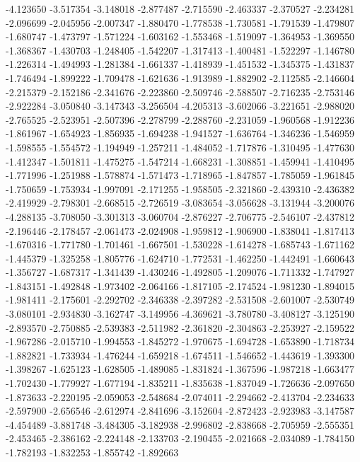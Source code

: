 -4.123650
-3.517354
-3.148018
-2.877487
-2.715590
-2.463337
-2.370527
-2.234281
-2.096699
-2.045956
-2.007347
-1.880470
-1.778538
-1.730581
-1.791539
-1.479807
-1.680747
-1.473797
-1.571224
-1.603162
-1.553468
-1.519097
-1.364953
-1.369550
-1.368367
-1.430703
-1.248405
-1.542207
-1.317413
-1.400481
-1.522297
-1.146780
-1.226314
-1.494993
-1.281384
-1.661337
-1.418939
-1.451532
-1.345375
-1.431837
-1.746494
-1.899222
-1.709478
-1.621636
-1.913989
-1.882902
-2.112585
-2.146604
-2.215379
-2.152186
-2.341676
-2.223860
-2.509746
-2.588507
-2.716235
-2.753146
-2.922284
-3.050840
-3.147343
-3.256504
-4.205313
-3.602066
-3.221651
-2.988020
-2.765525
-2.523951
-2.507396
-2.278799
-2.288760
-2.231059
-1.960568
-1.912236
-1.861967
-1.654923
-1.856935
-1.694238
-1.941527
-1.636764
-1.346236
-1.546959
-1.598555
-1.554572
-1.194949
-1.257211
-1.484052
-1.717876
-1.310495
-1.477630
-1.412347
-1.501811
-1.475275
-1.547214
-1.668231
-1.308851
-1.459941
-1.410495
-1.771996
-1.251988
-1.578874
-1.571473
-1.718965
-1.847857
-1.785059
-1.961845
-1.750659
-1.753934
-1.997091
-2.171255
-1.958505
-2.321860
-2.439310
-2.436382
-2.419929
-2.798301
-2.668515
-2.726519
-3.083654
-3.056628
-3.131944
-3.200076
-4.288135
-3.708050
-3.301313
-3.060704
-2.876227
-2.706775
-2.546107
-2.437812
-2.196446
-2.178457
-2.061473
-2.024908
-1.959812
-1.906900
-1.838041
-1.817413
-1.670316
-1.771780
-1.701461
-1.667501
-1.530228
-1.614278
-1.685743
-1.671162
-1.445379
-1.325258
-1.805776
-1.624710
-1.772531
-1.462250
-1.442491
-1.660643
-1.356727
-1.687317
-1.341439
-1.430246
-1.492805
-1.209076
-1.711332
-1.747927
-1.843151
-1.492848
-1.973402
-2.064166
-1.817105
-2.174524
-1.981230
-1.894015
-1.981411
-2.175601
-2.292702
-2.346338
-2.397282
-2.531508
-2.601007
-2.530749
-3.080101
-2.934830
-3.162747
-3.149956
-4.369621
-3.780780
-3.408127
-3.125190
-2.893570
-2.750885
-2.539383
-2.511982
-2.361820
-2.304863
-2.253927
-2.159522
-1.967286
-2.015710
-1.994553
-1.845272
-1.970675
-1.694728
-1.653890
-1.718734
-1.882821
-1.733934
-1.476244
-1.659218
-1.674511
-1.546652
-1.443619
-1.393300
-1.398267
-1.625123
-1.628505
-1.489085
-1.831824
-1.367596
-1.987218
-1.663477
-1.702430
-1.779927
-1.677194
-1.835211
-1.835638
-1.837049
-1.726636
-2.097650
-1.873633
-2.220195
-2.059053
-2.548684
-2.074011
-2.294662
-2.413704
-2.234633
-2.597900
-2.656546
-2.612974
-2.841696
-3.152604
-2.872423
-2.923983
-3.147587
-4.454489
-3.881748
-3.484305
-3.182938
-2.996802
-2.838668
-2.705959
-2.555351
-2.453465
-2.386162
-2.224148
-2.133703
-2.190455
-2.021668
-2.034089
-1.784150
-1.782193
-1.832253
-1.855742
-1.892663
